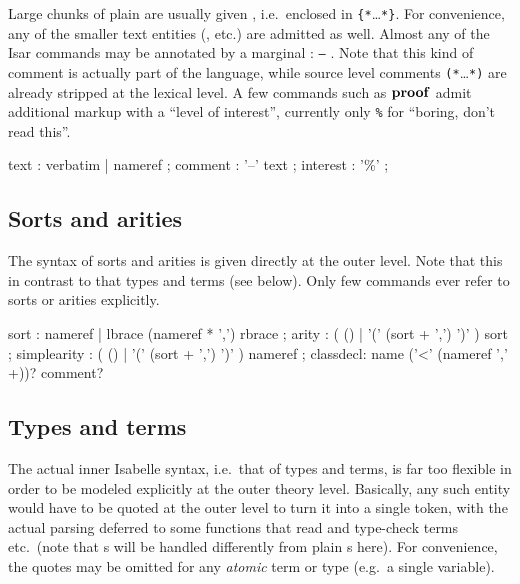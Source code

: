 Large chunks of plain  are usually given ,
i.e.\ enclosed in \verb|{*|\dots\verb|*}|.  For convenience, any of the
smaller text entities (,  etc.)  are
admitted as well.  Almost any of the Isar commands may be annotated by a
marginal : \texttt{--} .  Note that this
kind of comment is actually part of the language, while source level comments
\verb|(*|\dots\verb|*)| are already stripped at the lexical level.  A few
commands such as ${\mathord{\mathbf{proof}}}$ admit additional markup with a ``level of
interest'', currently only \texttt{\%} for ``boring, don't read this''.

\begin{rail}
  text : verbatim | nameref
  ;
  comment : '--' text
  ;
  interest : '\%'
  ;
\end{rail}


\subsection{Sorts and arities}

The syntax of sorts and arities is given directly at the outer level.  Note
that this in contrast to that types and terms (see below).  Only few commands
ever refer to sorts or arities explicitly.

\begin{rail}
  sort : nameref | lbrace (nameref * ',') rbrace
  ;
  arity : ( () | '(' (sort + ',') ')' ) sort
  ;
  simplearity : ( () | '(' (sort + ',') ')' ) nameref
  ;
  classdecl: name ('<' (nameref ',' +))? comment?
\end{rail}


\subsection{Types and terms}

The actual inner Isabelle syntax, i.e.\ that of types and terms, is far too
flexible in order to be modeled explicitly at the outer theory level.
Basically, any such entity would have to be quoted at the outer level to turn
it into a single token, with the actual parsing deferred to some functions
that read and type-check terms etc.\ (note that s will be
handled differently from plain s here).  For convenience, the
quotes may be omitted for any \emph{atomic} term or type (e.g.\ a single
variable).

